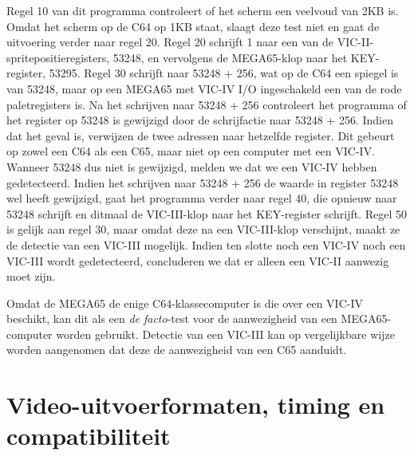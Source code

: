 
Regel 10 van dit programma controleert of het scherm een veelvoud van 2KB is. Omdat het scherm op de C64 op 1KB staat, slaagt deze test niet en gaat de uitvoering verder naar regel 20. Regel 20 schrijft 1 naar een van de VIC-II-spritepositieregisters, 53248, en vervolgens de MEGA65-klop naar het KEY-register, 53295. Regel 30 schrijft naar 53248 + 256, wat op de C64 een spiegel is van 53248, maar op een MEGA65 met VIC-IV I/O ingeschakeld een van de rode paletregisters is. Na het schrijven naar 53248 + 256 controleert het programma of het register op 53248 is gewijzigd door de schrijfactie naar 53248 + 256. Indien dat het geval is, verwijzen de twee adressen naar hetzelfde register. Dit gebeurt op zowel een C64 als een C65, maar niet op een computer met een VIC-IV. Wanneer 53248 dus niet is gewijzigd, melden we dat we een VIC-IV hebben gedetecteerd. Indien het schrijven naar 53248 + 256 de waarde in register 53248 wel heeft gewijzigd, gaat het programma verder naar regel 40, die opnieuw naar 53248 schrijft en ditmaal de VIC-III-klop naar het KEY-register schrijft. Regel 50 is gelijk aan regel 30, maar omdat deze na een VIC-III-klop verschijnt, maakt ze de detectie van een VIC-III mogelijk. Indien ten slotte noch een VIC-IV noch een VIC-III wordt gedetecteerd, concluderen we dat er alleen een VIC-II aanwezig moet zijn.

Omdat de MEGA65 de enige C64-klassecomputer is die over een VIC-IV beschikt, kan dit als een {\em de facto}-test voor de aanwezigheid van een MEGA65-computer worden gebruikt. Detectie van een VIC-III kan op vergelijkbare wijze worden aangenomen dat deze de aanwezigheid van een C65 aanduidt.

\section{Video-uitvoerformaten, timing en compatibiliteit}


